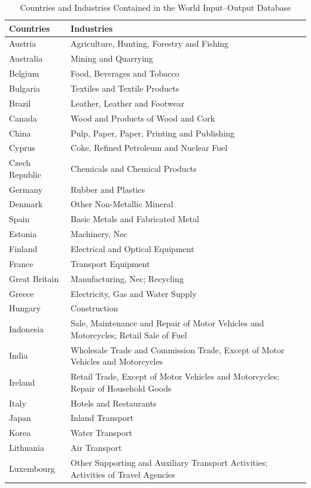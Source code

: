 \documentclass[a4paper,12pt]{article}
\begin{document}
\begin{table} [!hbtp] 
\caption{Countries and Industries Contained in the World Input--Output Database} 
\begin{center}
{\tiny \begin{tabular}{ll}
\textbf{Countries} & \textbf{Industries} \\ 
\hline
Austria & Agriculture, Hunting, Forestry and Fishing\\ 
Australia & Mining and Quarrying\\ 
Belgium & Food, Beverages and Tobacco\\ 
Bulgaria & Textiles and Textile Products\\ 
Brazil & Leather, Leather and Footwear\\ 
Canada & Wood and Products of Wood and Cork\\ 
China & Pulp, Paper, Paper, Printing and Publishing\\ 
Cyprus & Coke, Refined Petroleum and Nuclear Fuel\\ 
Czech Republic & Chemicals and Chemical Products\\ 
Germany & Rubber and Plastics\\ 
Denmark & Other Non-Metallic Mineral\\ 
Spain & Basic Metals and Fabricated Metal\\ 
Estonia & Machinery, Nec\\ 
Finland & Electrical and Optical Equipment\\ 
France & Transport Equipment\\ 
Great Britain & Manufacturing, Nec; Recycling\\ 
Greece & Electricity, Gas and Water Supply\\ 
Hungary & Construction\\ 
Indonesia & Sale, Maintenance and Repair of Motor Vehicles and Motorcycles; Retail Sale of Fuel\\ 
India & Wholesale Trade and Commission Trade, Except of Motor Vehicles and Motorcycles\\ 
Ireland & Retail Trade, Except of Motor Vehicles and Motorcycles; Repair of Household Goods\\ 
Italy & Hotels and Restaurants\\ 
Japan & Inland Transport\\ 
Korea & Water Transport\\ 
Lithuania & Air Transport\\ 
Luxembourg & Other Supporting and Auxiliary Transport Activities; Activities of Travel Agencies\\ 

\end{tabular}}
\end{center}
\end{table}
\end{document}

